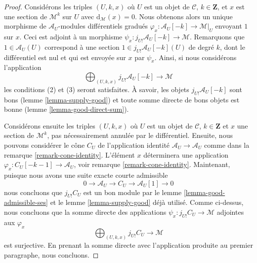 \begin{proof}
Considérons les triples $(U, k, x)$ où $U$ est un objet de $\mathcal{C}$,
$k \in \mathbf{Z}$, et $x$ est une section de $\mathcal{M}^k$ sur $U$ avec
$\text{d}_\mathcal{M}(x) = 0$. Nous obtenons alors un unique morphisme
de $\mathcal{A}_U$-modules différentiels gradués
$\varphi_x : \mathcal{A}_U[-k] \to \mathcal{M}|_U$
envoyant $1$ sur $x$. Ceci est adjoint à un morphisme
$\psi_x : j_{U!}\mathcal{A}_U[-k] \to \mathcal{M}$.
Remarquons que $1 \in \mathcal{A}_U(U)$ correspond à une
section $1 \in j_{U!}\mathcal{A}_U[-k](U)$ de degré $k$, dont le
différentiel est nul et qui est envoyée sur $x$ par $\psi_x$. Ainsi, si
nous considérons l'application
$$
\bigoplus\nolimits_{(U, k, x)} j_{U!}\mathcal{A}_U[-k]
\longrightarrow
\mathcal{M}
$$
les conditions (2) et (3) seront satisfaites. À savoir, les objets
$j_{U!}\mathcal{A}_U[-k]$ sont bons (lemme \ref{lemma-supply-good})
et toute somme directe de bons objets est bonne (lemme \ref{lemma-good-direct-sum}).

\medskip\noindent
Considérons ensuite les triples $(U, k, x)$ où $U$ est un objet de $\mathcal{C}$,
$k \in \mathbf{Z}$ et $x$ une section de $\mathcal{M}^k$, pas nécessairement annulée par
le différentiel. Ensuite, nous pouvons considérer le cône
$C_U$ de l'application identité $\mathcal{A}_U \to \mathcal{A}_U$ comme dans
la remarque \ref{remark-cone-identity}. L'élément $x$ déterminera une application
$\varphi_x : C_U[-k - 1] \to \mathcal{A}_U$, voir remarque
\ref{remark-cone-identity}. Maintenant, puisque nous
avons une suite exacte courte admissible
$$
0 \to \mathcal{A}_U \to C_U \to \mathcal{A}_U[1] \to 0
$$
nous concluons que $j_{U!}C_U$ est un bon module par le
lemme \ref{lemma-good-admissible-ses} et le
lemme \ref{lemma-supply-good} déjà utilisé. Comme
ci-dessus, nous concluons que la somme directe des applications
$\psi_x : j_{U!}C_U \to \mathcal{M}$ adjointes aux $\varphi_x$
$$
\bigoplus\nolimits_{(U, k, x)} j_{U!}C_U \longrightarrow \mathcal{M}
$$ est
surjective. En prenant la somme directe avec l'application produite
au premier paragraphe, nous concluons.
\end{proof}

